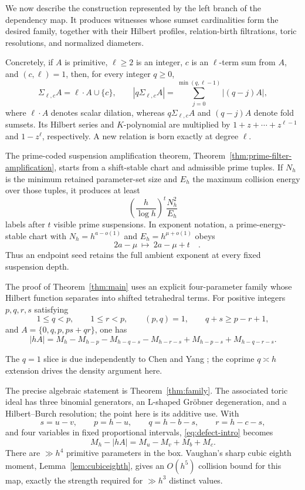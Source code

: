 \documentclass[11pt,reqno]{amsart}
\theoremstyle{definition}
\theoremstyle{remark}
\begin{document}
We now describe the construction represented by the left branch of the
dependency map.  It produces witnesses whose sumset cardinalities form the
desired family, together with their Hilbert profiles, relation-birth
filtrations, toric resolutions, and normalized diameters.

Concretely, if $A$ is primitive, $\ell\geq2$ is an integer, $c$ is an
$\ell$-term sum from $A$, and $(c,\ell)=1$, then, for every integer $q\geq0$,
\[
 \Sigma_{\ell,c}A=\ell\mathbin{\cdot}A\cup\{c\},\qquad
 |q\Sigma_{\ell,c}A|
 =\sum_{j=0}^{\min(q,\ell-1)}|(q-j)A|,
\]
where $\ell\mathbin{\cdot}A$ denotes scalar dilation, whereas
$q\Sigma_{\ell,c}A$ and $(q-j)A$ denote fold sumsets.  Its Hilbert series
and $K$-polynomial are multiplied by
$1+z+\cdots+z^{\ell-1}$ and $1-z^\ell$, respectively.  A new relation is
born exactly at degree $\ell$.

The prime-coded suspension amplification theorem,
Theorem~\ref{thm:prime-filter-amplification}, starts from a shift-stable
chart and admissible prime tuples.  If $N_h$ is the minimum retained
parameter-set size and $E_h$ the maximum collision energy over those tuples,
it produces at least
\[
 \left(\frac h{\log h}\right)^t\frac{N_h^2}{E_h}
\]
labels after $t$ visible prime suspensions.  In exponent notation, a
prime-energy-stable chart with $N_h=h^{a-o(1)}$ and
$E_h=h^{\mu+o(1)}$ obeys
\begin{equation}\label{eq:amplification-law-intro}
 \boxed{\quad 2a-\mu\ \longmapsto\ 2a-\mu+t\quad}.
\end{equation}
 Thus an endpoint seed retains the full ambient exponent at every fixed
 suspension depth.

The proof of Theorem~\ref{thm:main} uses an explicit four-parameter family
whose Hilbert function separates into shifted tetrahedral terms.  For positive
integers $p,q,r,s$
satisfying
\[
 1\leq q<p,\qquad 1\leq r<p,\qquad (p,q)=1,
 \qquad q+s\geq p-r+1,
\]
and $A=\{0,q,p,ps+qr\}$, one has
\begin{equation}\label{eq:defect-intro}
 |hA|=M_h-M_{h-p}-M_{h-q-s}-M_{h-r-s}
       +M_{h-p-s}+M_{h-q-r-s}.
\end{equation}

The $q=1$ slice is due independently to Chen and Yang
\cite[Corollary~1]{ChenYang2026}; the coprime $q\asymp h$ extension drives
the density argument here.

The precise algebraic statement is Theorem~\ref{thm:family}.  The associated toric
ideal has three binomial generators, an L-shaped Gr\"obner degeneration,
and a Hilbert--Burch resolution; the point here is its additive use.  With
\[
 s=u-v,\qquad p=h-u,\qquad q=h-b-s,\qquad r=h-c-s,
\]
and four variables in fixed proportional intervals, \eqref{eq:defect-intro}
becomes
\[
 M_h-|hA|=M_u-M_v+M_b+M_c.
\]
There are $\gg h^4$ primitive parameters in the box.  Vaughan's sharp cubic
eighth moment, Lemma~\ref{lem:cubiceighth}, gives an $O(h^5)$ collision bound
for this map, exactly the strength required for $\gg h^3$ distinct values.
\end{document}
